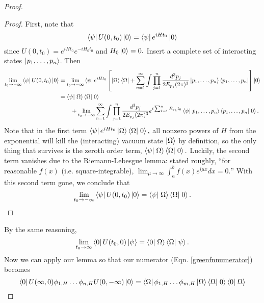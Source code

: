\begin{proof}
\begin{proof}
First, note that
$$\left< \psi \right|U(0,t_0)\left| 0 \right>=\left< \psi \right|e^{iHt_0}\left| 0 \right>$$
since $U(0,t_0)= e^{iHt_0}e^{-iH_0t_0}$ and $H_0\left| 0 \right>=0.$ Insert a complete set of interacting states $\left| p_1,\ldots, p_n \right>$. Then 
%
\begin{align*}
    \lim_{t_0\to-\infty} \bra{\psi}U(0,t_0)\ket{0}&=
    \lim_{t_0\to-\infty}\bra{\psi}e^{iHt_0}\left[\ket{\Omega}\bra{\Omega}+\sum_{n=1}^\infty \int  \prod_{j=1}^n \frac{d^3p_j}{2E_{p_j}(2\pi)^3}\ket{p_1,\ldots,p_n}\bra{p_1,\ldots,p_n}\right]\ket{0}\\
    &=\braket{\psi}{\Omega}\braket{\Omega}{0}\\
    &\qquad {}+
    \lim_{t_0\to-\infty}\sum_{n=1}^\infty \int  \prod_{j=1}^n \frac{d^3p_j}{2E_{p_j}(2\pi)^3} e^{i\sum_{k=1}^n E_{p_k} t_0}\braket{\psi}{p_1,\ldots,p_n}\braket{p_1,\ldots,p_n}{0}.
\end{align*}
%
Note that in the first term $\bra{\psi} e^{iHt_0}\ket{\Omega}\braket{\Omega}{0},$ all nonzero powers of $H$ from the exponential will kill the (interacting) vacuum state $\left| \Omega \right>$ by definition, so the only thing that survives is the zeroth order term, $\braket{\psi}{\Omega}\braket{\Omega}{0}.$ Luckily, the second term vanishes due to the Riemann-Lebesgue lemma: stated roughly, ``for reasonable $f(x)$ (i.e. square-integrable), $\lim_{\mu\to\infty} \int_a^b f(x)e^{i\mu x}dx=0.$'' With this second term gone, we conclude that
\begin{equation*}
  \lim_{t_0\to-\infty} \bra{\psi}U(0,t_0)\ket{0}=\braket{\psi}{\Omega}\braket{\Omega}{0}. \qedhere
\end{equation*}
\end{proof}
By the same reasoning,
\begin{equation}
    \lim_{t_0\to\infty} \bra{0} U(t_0,0)\ket{\psi}=\braket{0}{\Omega}\braket{\Omega}{\psi}.
\end{equation}
Now we can apply our lemma so that our numerator (Eqn. \ref{greenfnnumerator}) becomes
\begin{equation}
    \bra{0}U(\infty,0)\phi_{1,H}\ldots \phi_{n,H} U(0,-\infty)\ket{0}=
        \bra{\Omega}\phi_{1,H}\ldots \phi_{m,H}\ket{\Omega}
        \braket{\Omega}{0}\braket{0}{\Omega}
\end{equation}

\end{proof}
